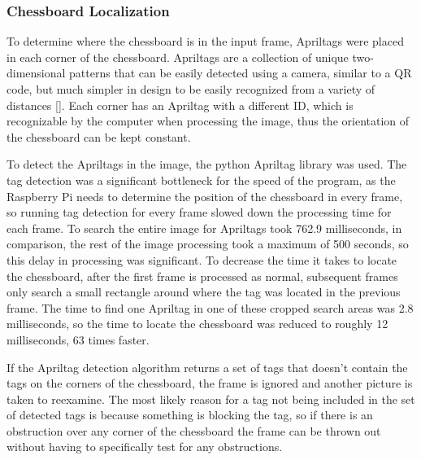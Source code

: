 \documentclass[journal]{IEEEtran}
\begin{document}
\vspace{12pt}

\subsubsection{Chessboard Localization}
\label{ApriltagDetection}
To determine where the chessboard is in the input frame, Apriltags were placed in each corner of the chessboard. Apriltags are a collection of unique two-dimensional patterns that can be easily detected using a camera, similar to a QR code, but much simpler in design to be easily recognized from a variety of distances [\cite{Wang2016}]. Each corner has an Apriltag with a different ID, which is recognizable by the computer when processing the image, thus the orientation of the chessboard can be kept constant.

To detect the Apriltags in the image, the python Apriltag library was used.
The tag detection was a significant bottleneck for the speed of the program, as the Raspberry Pi needs to determine the position of the chessboard in every frame, so running tag detection for every frame slowed down the processing time for each frame. To search the entire image for Apriltags took 762.9 milliseconds, in comparison, the rest of the image processing took a maximum of 500 seconds, so this delay in processing was significant.
To decrease the time it takes to locate the chessboard, after the first frame is processed as normal, subsequent frames only search a small rectangle around where the tag was located in the previous frame. The time to find one Apriltag in one of these cropped search areas was 2.8 milliseconds, so the time to locate the chessboard was reduced to roughly 12 milliseconds, 63 times faster.

If the Apriltag detection algorithm returns a set of tags that doesn't contain the tags on the corners of the chessboard, the frame is ignored and another picture is taken to reexamine. The most likely reason for a tag not being included in the set of detected tags is because something is blocking the tag, so if there is an obstruction over any corner of the chessboard the frame can be thrown out without having to specifically test for any obstructions.
\end{document}

